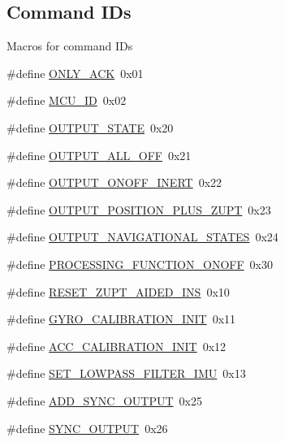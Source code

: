 \subsection*{\-Command \-I\-Ds}
\label{_amgrpdd8e66e4161fe2b0a7d453e3b74a9976}%
 \-Macros for command \-I\-Ds \begin{DoxyCompactItemize}
\item 
\#define \hyperlink{group__control__tables_gac08e4ee0ee7d39737aad3c8f0345125f}{\-O\-N\-L\-Y\-\_\-\-A\-C\-K}~0x01
\item 
\#define \hyperlink{group__control__tables_ga6b19b2455c7df9d39618ea3a8b76862f}{\-M\-C\-U\-\_\-\-I\-D}~0x02
\item 
\#define \hyperlink{group__control__tables_gac99194fc1af41c8aa6d9efd08ede1f22}{\-O\-U\-T\-P\-U\-T\-\_\-\-S\-T\-A\-T\-E}~0x20
\item 
\#define \hyperlink{group__control__tables_gae0b2c5c10091e2d401594f7b1ca994bd}{\-O\-U\-T\-P\-U\-T\-\_\-\-A\-L\-L\-\_\-\-O\-F\-F}~0x21
\item 
\#define \hyperlink{group__control__tables_ga237ed802e40a56c4819fae1c02bb0ef2}{\-O\-U\-T\-P\-U\-T\-\_\-\-O\-N\-O\-F\-F\-\_\-\-I\-N\-E\-R\-T}~0x22
\item 
\#define \hyperlink{group__control__tables_gaa36cf28d2178f23468bb7d841ef2751c}{\-O\-U\-T\-P\-U\-T\-\_\-\-P\-O\-S\-I\-T\-I\-O\-N\-\_\-\-P\-L\-U\-S\-\_\-\-Z\-U\-P\-T}~0x23
\item 
\#define \hyperlink{group__control__tables_ga0c9de18d6dd10a57ecac1e77ea348070}{\-O\-U\-T\-P\-U\-T\-\_\-\-N\-A\-V\-I\-G\-A\-T\-I\-O\-N\-A\-L\-\_\-\-S\-T\-A\-T\-E\-S}~0x24
\item 
\#define \hyperlink{group__control__tables_ga4a949ef22a9067dfeab6d8a1f5dcdcb2}{\-P\-R\-O\-C\-E\-S\-S\-I\-N\-G\-\_\-\-F\-U\-N\-C\-T\-I\-O\-N\-\_\-\-O\-N\-O\-F\-F}~0x30
\item 
\#define \hyperlink{group__control__tables_gafcdf5f9fe1453405ee1fa33d809a0e33}{\-R\-E\-S\-E\-T\-\_\-\-Z\-U\-P\-T\-\_\-\-A\-I\-D\-E\-D\-\_\-\-I\-N\-S}~0x10
\item 
\#define \hyperlink{group__control__tables_gaf9005cd230f9c8b3987cad4597a80d3f}{\-G\-Y\-R\-O\-\_\-\-C\-A\-L\-I\-B\-R\-A\-T\-I\-O\-N\-\_\-\-I\-N\-I\-T}~0x11
\item 
\#define \hyperlink{group__control__tables_ga4fa18373c8638280f359f99358fcc685}{\-A\-C\-C\-\_\-\-C\-A\-L\-I\-B\-R\-A\-T\-I\-O\-N\-\_\-\-I\-N\-I\-T}~0x12
\item 
\#define \hyperlink{group__control__tables_ga8bcc9a14d954ffead9edfa80f68dc99c}{\-S\-E\-T\-\_\-\-L\-O\-W\-P\-A\-S\-S\-\_\-\-F\-I\-L\-T\-E\-R\-\_\-\-I\-M\-U}~0x13
\item 
\#define \hyperlink{group__control__tables_gadd0f9ff2a48d64e6b6fde44116089531}{\-A\-D\-D\-\_\-\-S\-Y\-N\-C\-\_\-\-O\-U\-T\-P\-U\-T}~0x25
\item 
\#define \hyperlink{group__control__tables_ga6a4fabc408d6210436da0220b2e92ae0}{\-S\-Y\-N\-C\-\_\-\-O\-U\-T\-P\-U\-T}~0x26
\end{DoxyCompactItemize}



